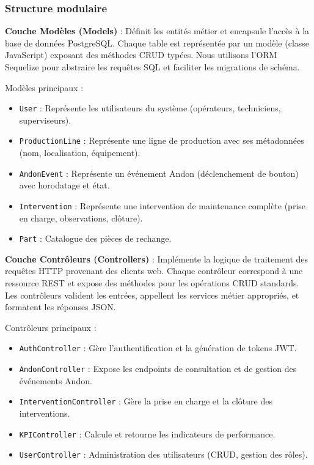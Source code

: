 \subsubsection{Structure modulaire}

\textbf{Couche Modèles (Models)} : Définit les entités métier et encapsule l'accès à la base de données PostgreSQL. Chaque table est représentée par un modèle (classe JavaScript) exposant des méthodes CRUD typées. Nous utilisons l'ORM Sequelize pour abstraire les requêtes SQL et faciliter les migrations de schéma.

Modèles principaux :
\begin{itemize}
    \item \texttt{User} : Représente les utilisateurs du système (opérateurs, techniciens, superviseurs).
    \item \texttt{ProductionLine} : Représente une ligne de production avec ses métadonnées (nom, localisation, équipement).
    \item \texttt{AndonEvent} : Représente un événement Andon (déclenchement de bouton) avec horodatage et état.
    \item \texttt{Intervention} : Représente une intervention de maintenance complète (prise en charge, observations, clôture).
    \item \texttt{Part} : Catalogue des pièces de rechange.
\end{itemize}

\textbf{Couche Contrôleurs (Controllers)} : Implémente la logique de traitement des requêtes HTTP provenant des clients web. Chaque contrôleur correspond à une ressource REST et expose des méthodes pour les opérations CRUD standards. Les contrôleurs valident les entrées, appellent les services métier appropriés, et formatent les réponses JSON.

Contrôleurs principaux :
\begin{itemize}
    \item \texttt{AuthController} : Gère l'authentification et la génération de tokens JWT.
    \item \texttt{AndonController} : Expose les endpoints de consultation et de gestion des événements Andon.
    \item \texttt{InterventionController} : Gère la prise en charge et la clôture des interventions.
    \item \texttt{KPIController} : Calcule et retourne les indicateurs de performance.
    \item \texttt{UserController} : Administration des utilisateurs (CRUD, gestion des rôles).
\end{itemize}

